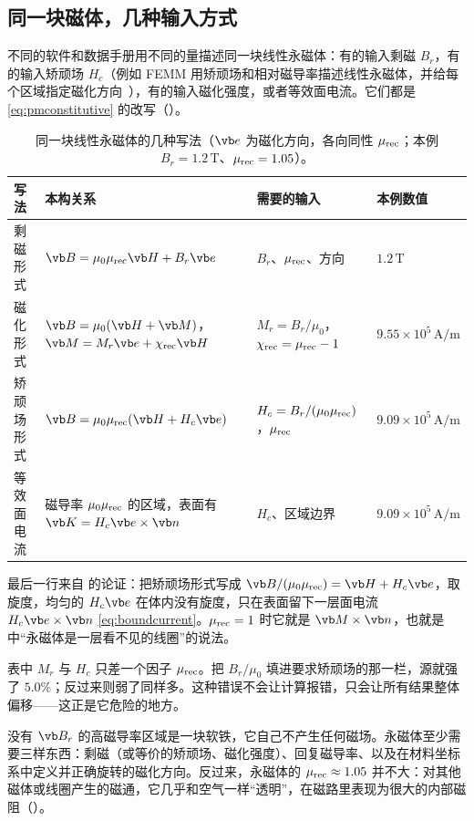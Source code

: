 \subsection{同一块磁体，几种输入方式}
不同的软件和数据手册用不同的量描述同一块线性永磁体：有的输入剩磁 $B_r$，有的输入矫顽场 $H_c$（例如 FEMM 用矫顽场和相对磁导率描述线性永磁体，并给每个区域指定磁化方向~\cite{femm}），有的输入磁化强度，或者等效面电流。它们都是 \eqref{eq:pmconstitutive} 的改写（）。

\begin{table}[htbp]\centering\small
\caption{同一块线性永磁体的几种写法（$\vb e$ 为磁化方向，各向同性 $\mu_{\rm rec}$；本例 $B_r=1.2\,\mathrm T$、$\mu_{\rm rec}=1.05$）。}\label{tab:magnets-conventions}
\begin{tabularx}{\linewidth}{@{}>{\raggedright\arraybackslash}p{.16\linewidth} >{\raggedright\arraybackslash}p{.33\linewidth} Y >{\raggedright\arraybackslash}p{.15\linewidth}@{}}
\toprule
写法 & 本构关系 & 需要的输入 & 本例数值\\\midrule
剩磁形式 & $\vb B=\mu_0\mu_{\rm rec}\vb H+B_r\vb e$ & $B_r$、$\mu_{\rm rec}$、方向 & $1.2\,\mathrm T$\\
磁化形式 & $\vb B=\mu_0(\vb H+\vb M)$，$\vb M=M_r\vb e+\chi_{\rm rec}\vb H$ & $M_r=B_r/\mu_0$，$\chi_{\rm rec}=\mu_{\rm rec}-1$ & $9.55\times10^5\,\mathrm{A/m}$\\
矫顽场形式 & $\vb B=\mu_0\mu_{\rm rec}(\vb H+H_c\vb e)$ & $H_c=B_r/(\mu_0\mu_{\rm rec})$，$\mu_{\rm rec}$ & $9.09\times10^5\,\mathrm{A/m}$\\
等效面电流 & 磁导率 $\mu_0\mu_{\rm rec}$ 的区域，表面有 $\vb K=H_c\vb e\times\vb n$ & $H_c$、区域边界 & $9.09\times10^5\,\mathrm{A/m}$\\
\bottomrule
\end{tabularx}
\end{table}

最后一行来自 的论证：把矫顽场形式写成 $\vb B/(\mu_0\mu_{\rm rec})=\vb H+H_c\vb e$，取旋度，均匀的 $H_c\vb e$ 在体内没有旋度，只在表面留下一层面电流 $H_c\vb e\times\vb n$ \eqref{eq:boundcurrent}。$\mu_{\rm rec}=1$ 时它就是 $\vb M\times\vb n$，也就是 中“永磁体是一层看不见的线圈”的说法。

表中 $M_r$ 与 $H_c$ 只差一个因子 $\mu_{\rm rec}$。把 $B_r/\mu_0$ 填进要求矫顽场的那一栏，源就强了 $5.0\%$；反过来则弱了同样多。这种错误不会让计算报错，只会让所有结果整体偏移——这正是它危险的地方。

\begin{pitfall}
没有 $\vb B_r$ 的高磁导率区域是一块软铁，它自己不产生任何磁场。永磁体至少需要三样东西：剩磁（或等价的矫顽场、磁化强度）、回复磁导率、以及在材料坐标系中定义并正确旋转的磁化方向。反过来，永磁体的 $\mu_{\rm rec}\approx1.05$ 并不大：对其他磁体或线圈产生的磁通，它几乎和空气一样“透明”，在磁路里表现为很大的内部磁阻（）。
\end{pitfall}

